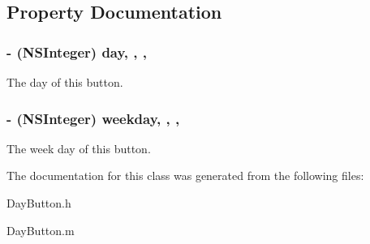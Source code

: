 \subsection{Property Documentation}
\hypertarget{interface_day_button_a1a1e6a38a27c7ffafcd2b47c9e677ce3}{
\subsubsection[{day}]{\setlength{\rightskip}{0pt plus 5cm}-\/ (N\+S\+Integer) day\hspace{0.3cm}{\ttfamily [read]}, {\ttfamily [write]}, {\ttfamily [nonatomic]}, {\ttfamily [assign]}}}\label{interface_day_button_a1a1e6a38a27c7ffafcd2b47c9e677ce3}
The day of this button. \hypertarget{interface_day_button_a992bfe27780dcf5616639d4259a7b1b6}{
\subsubsection[{weekday}]{\setlength{\rightskip}{0pt plus 5cm}-\/ (N\+S\+Integer) weekday\hspace{0.3cm}{\ttfamily [read]}, {\ttfamily [write]}, {\ttfamily [nonatomic]}, {\ttfamily [assign]}}}\label{interface_day_button_a992bfe27780dcf5616639d4259a7b1b6}
The week day of this button. 

The documentation for this class was generated from the following files\+:\begin{DoxyCompactItemize}
\item 
Day\+Button.\+h\item 
Day\+Button.\+m\end{DoxyCompactItemize}

